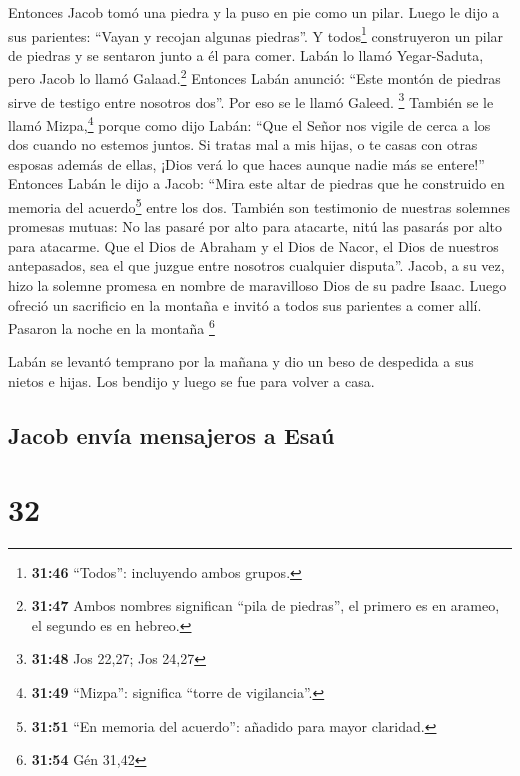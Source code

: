  Entonces Jacob tomó una piedra y la puso en pie como un
pilar.  Luego le dijo a sus parientes: ``Vayan y recojan
algunas piedras''. Y todos\footnote{\textbf{31:46} ``Todos'': incluyendo
  ambos grupos.} construyeron un pilar de piedras y se sentaron junto a
él para comer.  Labán lo llamó Yegar-Saduta, pero Jacob
lo llamó Galaad.\footnote{\textbf{31:47} Ambos nombres significan ``pila
  de piedras'', el primero es en arameo, el segundo es en hebreo.}
 Entonces Labán anunció: ``Este montón de piedras sirve
de testigo entre nosotros dos''. Por eso se le llamó Galeed. \footnote{\textbf{31:48}
  Jos 22,27; Jos 24,27}  También se le llamó
Mizpa,\footnote{\textbf{31:49} ``Mizpa'': significa ``torre de
  vigilancia''.} porque como dijo Labán: ``Que el Señor nos vigile de
cerca a los dos cuando no estemos juntos.  Si tratas mal
a mis hijas, o te casas con otras esposas además de ellas, ¡Dios verá lo
que haces aunque nadie más se entere!''  Entonces Labán
le dijo a Jacob: ``Mira este altar de piedras que he construido en
memoria del acuerdo\footnote{\textbf{31:51} ``En memoria del acuerdo'':
  añadido para mayor claridad.} entre los dos.  También
son testimonio de nuestras solemnes promesas mutuas: No las pasaré por
alto para atacarte, nitú las pasarás por alto para atacarme.
 Que el Dios de Abraham y el Dios de Nacor, el Dios de
nuestros antepasados, sea el que juzgue entre nosotros cualquier
disputa''. Jacob, a su vez, hizo la solemne promesa en nombre de
maravilloso Dios de su padre Isaac.  Luego ofreció un
sacrificio en la montaña e invitó a todos sus parientes a comer allí.
Pasaron la noche en la montaña \footnote{\textbf{31:54} Gén 31,42}

 Labán se levantó temprano por la mañana y dio un beso de
despedida a sus nietos e hijas. Los bendijo y luego se fue para volver a
casa.

\hypertarget{jacob-envuxeda-mensajeros-a-esauxfa}{%
\subsection{Jacob envía mensajeros a
Esaú}\label{jacob-envuxeda-mensajeros-a-esauxfa}}

\hypertarget{section-31}{%
\section{32}\label{section-31}}


